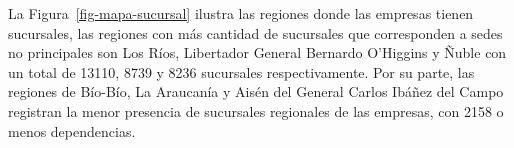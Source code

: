 \documentclass[
  11pt,
]{article}
\begin{document}
\begin{table}

\caption{\label{tbl-region}Resultados de la encuesta}


\end{table}%

\newpage

La Figura~\ref{fig-mapa-sucursal} ilustra las regiones donde las
empresas tienen sucursales, las regiones con más cantidad de sucursales
que corresponden a sedes no principales son Los Ríos, Libertador General
Bernardo O'Higgins y Ñuble con un total de 13110, 8739 y 8236 sucursales
respectivamente. Por su parte, las regiones de Bío-Bío, La Araucanía y
Aisén del General Carlos Ibáñez del Campo registran la menor presencia
de sucursales regionales de las empresas, con 2158 o menos dependencias.
\end{document}
